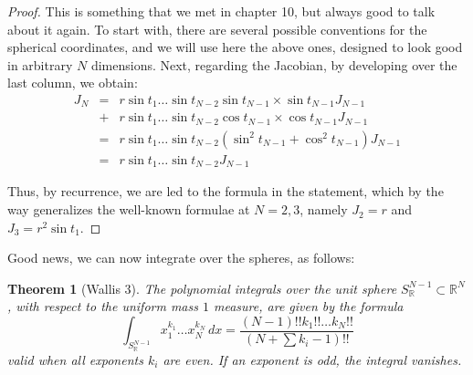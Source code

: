 \documentclass[12pt]{amsbook}
\newtheorem{theorem}{Theorem}[chapter]
\begin{document}
\begin{proof}
This is something that we met in chapter 10, but always good to talk about it again. To start with, there are several possible conventions for the spherical coordinates, and we will use here the above ones, designed to look good in arbitrary $N$ dimensions. Next, regarding the Jacobian, by developing over the last column, we obtain:
\begin{eqnarray*}
J_N
&=&r\sin t_1\ldots\sin t_{N-2}\sin t_{N-1}\times \sin t_{N-1}J_{N-1}\\
&+&r\sin t_1\ldots \sin t_{N-2}\cos t_{N-1}\times\cos t_{N-1}J_{N-1}\\
&=&r\sin t_1\ldots\sin t_{N-2}(\sin^2 t_{N-1}+\cos^2 t_{N-1})J_{N-1}\\
&=&r\sin t_1\ldots\sin t_{N-2}J_{N-1}
\end{eqnarray*}

Thus, by recurrence, we are led to the formula in the statement, which by the way generalizes the well-known formulae at $N=2,3$, namely $J_2=r$ and $J_3=r^2\sin t_1$.
\end{proof}

Good news, we can now integrate over the spheres, as follows:


\begin{theorem}[Wallis 3]
The polynomial integrals over the unit sphere $S^{N-1}_\mathbb R\subset\mathbb R^N$, with respect to the uniform mass $1$ measure, are given by the formula
$$\int_{S^{N-1}_\mathbb R}x_1^{k_1}\ldots x_N^{k_N}\,dx=\frac{(N-1)!!k_1!!\ldots k_N!!}{(N+\sum k_i-1)!!}$$
valid when all exponents $k_i$ are even. If an exponent is odd, the integral vanishes.
\end{theorem}
\end{document}
